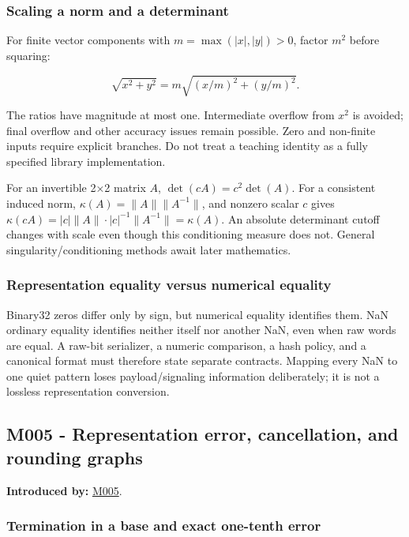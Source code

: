 \subsubsection{Scaling a norm and a determinant}\label{scaling-a-norm-and-a-determinant}

For finite vector components with \(m=\max(|x|,|y|)>0\), factor \(m^2\) before squaring:

\[
\sqrt{x^2+y^2}=m\sqrt{(x/m)^2+(y/m)^2}.
\]

The ratios have magnitude at most one. Intermediate overflow from \(x^2\) is avoided; final overflow and other accuracy issues remain possible. Zero and non-finite inputs require explicit branches. Do not treat a teaching identity as a fully specified library implementation.

For an invertible 2×2 matrix \(A\), \(\det(cA)=c^2\det(A)\). For a consistent induced norm, \(\kappa(A)=\|A\|\|A^{-1}\|\), and nonzero scalar \(c\) gives \(\kappa(cA)=|c|\|A\|\cdot|c|^{-1}\|A^{-1}\|=\kappa(A)\). An absolute determinant cutoff changes with scale even though this conditioning measure does not. General singularity/conditioning methods await later mathematics.

\subsubsection{Representation equality versus numerical equality}\label{representation-equality-versus-numerical-equality}

Binary32 zeros differ only by sign, but numerical equality identifies them. NaN ordinary equality identifies neither itself nor another NaN, even when raw words are equal. A raw-bit serializer, a numeric comparison, a hash policy, and a canonical format must therefore state separate contracts. Mapping every NaN to one quiet pattern loses payload/signaling information deliberately; it is not a lossless representation conversion.

\subsection{M005 - Representation error, cancellation, and rounding graphs}\label{m005---representation-error-cancellation-and-rounding-graphs}

\textbf{Introduced by:} \hyperref[01-foundations-i-ch001]{M005}.

\subsubsection{Termination in a base and exact one-tenth error}\label{termination-in-a-base-and-exact-one-tenth-error}

